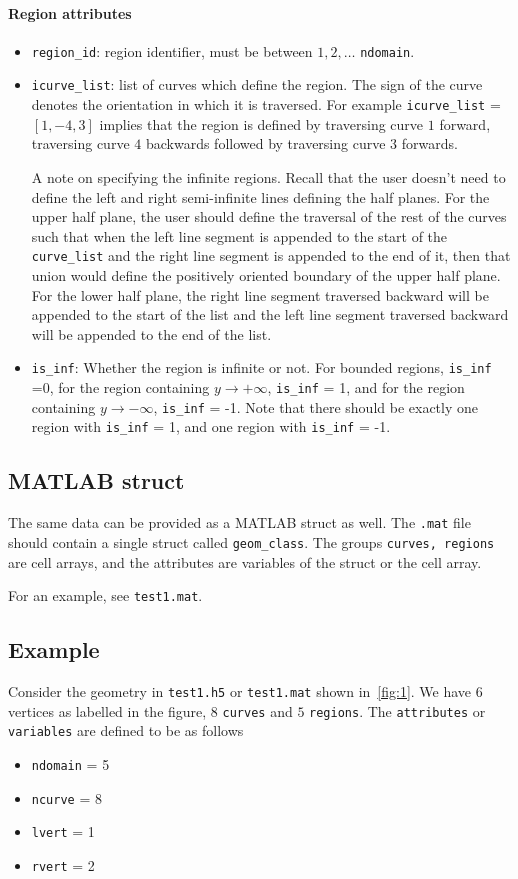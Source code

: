 \documentclass[11pt]{article}
\theoremstyle{definition}
\theoremstyle{remark}
\numberwithin{equation}{section}
\begin{document}
\paragraph{Region attributes}
\begin{itemize}
\item \texttt{region\_id}: region identifier, must be between $1,2,\ldots$ \texttt{ndomain}.
\item \texttt{icurve\_list}: list of curves which define the region. The sign of the curve denotes the orientation in which it is traversed. For example \texttt{icurve\_list} = $[1,-4,3]$ implies that the region is defined by traversing curve $1$ forward, traversing curve $4$ backwards followed by traversing curve $3$ forwards. 

A note on specifying the infinite regions. Recall that the user doesn't need to define the left and right semi-infinite lines defining the half planes. For the upper half plane, the user should define the traversal of the rest of the curves such that when the left line segment is appended to the start of the \texttt{curve\_list} and the right line segment is appended to the end of it, then that union would define the positively oriented boundary of the upper half plane. 
For the lower half plane, the right line segment traversed backward will be appended to the start of the list and the left line segment traversed backward will be appended to the end of the list.
\item \texttt{is\_inf}: Whether the region is infinite or not. For bounded regions, \texttt{is\_inf} =0, for the region containing $y \to + \infty$, \texttt{is\_inf} = 1, and for the region containing $y \to - \infty$, \texttt{is\_inf} = -1.
Note that there should be exactly one region with \texttt{is\_inf} = 1, and one region with \texttt{is\_inf} = -1.
\end{itemize}
\subsection{MATLAB struct}
The same data can be provided as a MATLAB struct as well. The \texttt{.mat} file should contain a single struct called \texttt{geom\_class}. The groups \texttt{curves, regions} are cell arrays, and the attributes are variables of the struct or the cell array. 

For an example, see \texttt{test1.mat}.
\subsection{Example}
Consider the geometry in \texttt{test1.h5} or \texttt{test1.mat} shown in~\cref{fig:1}. We have $6$ vertices as labelled in the figure, $8$ \texttt{curves} and $5$ \texttt{regions}. The \texttt{attributes} or \texttt{variables} are defined to be as follows
\begin{itemize}
\item \texttt{ndomain}  = 5
\item \texttt{ncurve} = 8
\item \texttt{lvert} = 1
\item \texttt{rvert} = 2
\end{itemize} 
\end{document}
